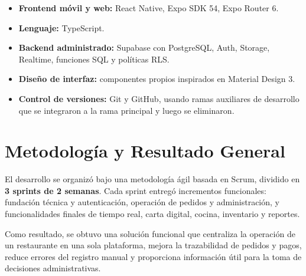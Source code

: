 \begin{itemize}[leftmargin=1.5em]
  \item \textbf{Frontend móvil y web:} React Native, Expo SDK 54, Expo Router 6.
  \item \textbf{Lenguaje:} TypeScript.
  \item \textbf{Backend administrado:} Supabase con PostgreSQL, Auth, Storage,
        Realtime, funciones SQL y políticas RLS.
  \item \textbf{Diseño de interfaz:} componentes propios inspirados en Material
        Design 3.
  \item \textbf{Control de versiones:} Git y GitHub, usando ramas auxiliares de
        desarrollo que se integraron a la rama principal y luego se eliminaron.
\end{itemize}

\section{Metodología y Resultado General}

El desarrollo se organizó bajo una metodología ágil basada en Scrum, dividido en
\textbf{3 sprints de 2 semanas}. Cada sprint entregó incrementos funcionales:
fundación técnica y autenticación, operación de pedidos y administración, y
funcionalidades finales de tiempo real, carta digital, cocina, inventario y
reportes.

Como resultado, se obtuvo una solución funcional que centraliza la operación de un
restaurante en una sola plataforma, mejora la trazabilidad de pedidos y pagos,
reduce errores del registro manual y proporciona información útil para la toma de
decisiones administrativas.
